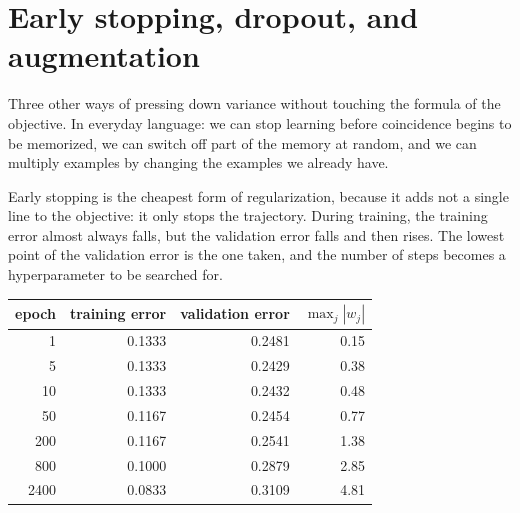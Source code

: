 \section{Early stopping, dropout, and augmentation}

Three other ways of pressing down variance without touching the formula of the
objective. In everyday language: we can stop learning before coincidence begins to
be memorized, we can switch off part of the memory at random, and we can multiply
examples by changing the examples we already have.

Early stopping is the cheapest form of regularization, because it adds not a single
line to the objective: it only stops the trajectory. During training, the training
error almost always falls, but the validation error falls and then rises. The lowest
point of the validation error is the one taken, and the number of steps becomes a
hyperparameter to be searched for.

\begin{center}
\small
\begin{tabular}{rrrr}
\hline
epoch & training error & validation error & $\max_j|w_j|$ \\
\hline
1    & 0.1333 & 0.2481 & 0.15 \\
5    & 0.1333 & 0.2429 & 0.38 \\
10   & 0.1333 & 0.2432 & 0.48 \\
50   & 0.1167 & 0.2454 & 0.77 \\
200  & 0.1167 & 0.2541 & 1.38 \\
800  & 0.1000 & 0.2879 & 2.85 \\
2400 & 0.0833 & 0.3109 & 4.81 \\
\hline
\end{tabular}
\end{center}

